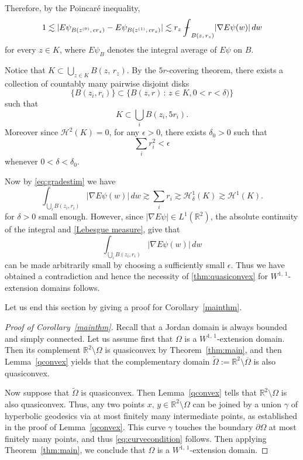 \documentclass[reqno,11pt]{amsart}
\def\ch{{\mathcal H}}
\def\ez{\epsilon}
\def\wz{\widetilde}
\def\ls{\lesssim}
\def\gs{\gtrsim}
\def\bint{{\ifinner\rlap{\bf\kern.35em--}
\int\else\rlap{\bf\kern.45em--}\int\fi}\ignorespaces}
\numberwithin{equation}{section}
\theoremstyle{remark}
\def\bint{{\ifinner\rlap{\bf\kern.35em--}
\int\else\rlap{\bf\kern.45em--}\int\fi}\ignorespaces}
\begin{document}
Therefore, by the Poincar\'e inequality,
\begin{equation}\label{eq:gradestim}
 1 \ls  |E\psi_{B(z^{(0)},\,cr_z)}- E\psi_{B(z^{(1)},\,cr_z)}|
 \ls r_z\bint_{B(z,\,r_z)}|\nabla E\psi(w)|\,dw
\end{equation} for every $z \in K$, where $E\psi_{B}$ denotes the integral average of $E\psi$ on $B$. 


Notice that $K\subset \bigcup_{z\in K}B(z,\,r_z)$.  By the
$5r$-covering theorem, %
there exists a collection of countably many pairwise disjoint disks
\[
\{B(z_i,r_i)\} \subset \{B(z,r) \,:\,z \in K, 0 < r < \delta) \} 
\]
such that 
\[
K \subset \bigcup_i B(z_i,5r_i). 
\]
Moreover since $\mathcal H^2(K)=0$, for any $\ez>0$, 
there exists $\delta_0>0$ such that 
\begin{equation}\label{Lebesgue measure}
 \sum_i r_i^2 < \ez
\end{equation}
whenever $0<\delta<\delta_0.$

Now by \eqref{eq:gradestim} we have
\[
 \int_{\bigcup_iB(z_i,r_i)} |\nabla E\psi(w)|\,dw \gs \sum_ir_i \gs \ch^1_\delta(K) \gtrsim \ch^1(K). 
\]
for $\delta>0$ small enough. However, since $|\nabla E\psi|\in L^{1}(\mathbb R^2)$, the absolute continuity of the integral and \eqref{Lebesgue measure}, 
give that
\[
\int_{\bigcup_iB(z_i,r_i)} |\nabla E\psi(w)|\,dw 
\]
can be made arbitrarily small by choosing a sufficiently small
$\ez$. Thus we have obtained a contradiction and hence the 
necessity of \eqref{thm:quasiconvex} for $W^{1,\,1}$-extension domains follows.

 
Let us end this section by giving a proof for Corollary~\ref{mainthm}.
\begin{proof}[Proof of Corollary~\ref{mainthm}]
Recall  that a Jordan domain is always bounded and simply connected.   Let us assume first that $\Omega$ is a $W^{1,\,1}$-extension domain. Then its complement $\mathbb R^2\setminus \Omega$ is quasiconvex by Theorem~\ref{thm:main}, and then Lemma~\ref{qconvex} yields that the complementary domain $\wz\Omega:=\mathbb R^2\setminus \overline{\Omega}$ is also quasiconvex. 

Now suppose that $\wz\Omega$ is quasiconvex. Then Lemma~\ref{qconvex} tells that $\mathbb R^2\setminus \Omega$ is also quasiconvex. Thus, any two points $x,\,y\in \mathbb R^2\setminus \Omega$ can be joined by a union $\gamma$ of hyperbolic geodesics via at most finitely many intermediate points, as established in the proof of Lemma~\ref{qconvex}. This curve $\gamma$ touches the boundary $\partial \Omega$ at most finitely many points, and thus \eqref{eq:curvecondition} follows. Then applying Theorem~\ref{thm:main}, we conclude that $\Omega$ is a $W^{1,\,1}$-extension domain. 
\end{proof}
\end{document}
